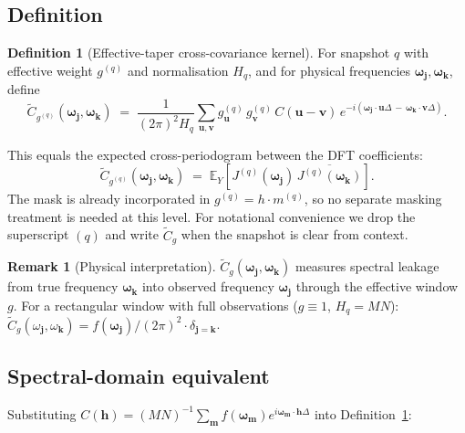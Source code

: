 \documentclass[12pt]{article}
\theoremstyle{definition}
\newtheorem{definition}{Definition}
\newtheorem{remark}{Remark}
\begin{document}
\subsection{Definition}

\begin{definition}[Effective-taper cross-covariance kernel]
\label{def:Ctilde}
For snapshot $q$ with effective weight $g^{(q)}$ and normalisation $H_q$,
and for physical frequencies $\boldsymbol{\omega}_{\mathbf{j}},\boldsymbol{\omega}_{\mathbf{k}}$, define
\[
\boxed{
  \tilde{C}_{g^{(q)}}(\boldsymbol{\omega}_{\mathbf{j}},\boldsymbol{\omega}_{\mathbf{k}})
  \;=\; \frac{1}{(2\pi)^2 H_q}
    \sum_{\mathbf{u},\mathbf{v}}
    g^{(q)}_{\mathbf{u}}\,g^{(q)}_{\mathbf{v}}\,C(\mathbf{u}-\mathbf{v})\,
    e^{-i(\boldsymbol{\omega}_{\mathbf{j}}\cdot\mathbf{u}\Delta\,-\,\boldsymbol{\omega}_{\mathbf{k}}\cdot\mathbf{v}\Delta)}.
}
\]
\end{definition}

This equals the expected cross-periodogram between the DFT coefficients:
\[
  \tilde{C}_{g^{(q)}}(\boldsymbol{\omega}_{\mathbf{j}},\boldsymbol{\omega}_{\mathbf{k}})
  \;=\; \mathbb{E}_Y\!\left[J^{(q)}(\boldsymbol{\omega}_{\mathbf{j}})\,
                             \overline{J^{(q)}(\boldsymbol{\omega}_{\mathbf{k}})}\right].
\]
The mask is already incorporated in $g^{(q)} = h\cdot m^{(q)}$,
so no separate masking treatment is needed at this level.
For notational convenience we drop the superscript $(q)$ and write
$\tilde{C}_g$ when the snapshot is clear from context.

\begin{remark}[Physical interpretation]
$\tilde{C}_g(\boldsymbol{\omega}_{\mathbf{j}},\boldsymbol{\omega}_{\mathbf{k}})$ measures spectral leakage
from true frequency $\boldsymbol{\omega}_{\mathbf{k}}$ into observed frequency
$\boldsymbol{\omega}_{\mathbf{j}}$ through the effective window $g$.
For a rectangular window with full observations ($g\equiv 1$,
$H_q = MN$): $\tilde{C}_g(\omega_{\mathbf{j}},\omega_{\mathbf{k}})
= f(\boldsymbol{\omega}_{\mathbf{j}})/(2\pi)^2\cdot\delta_{\mathbf{j}=\mathbf{k}}$.
\end{remark}

\subsection{Spectral-domain equivalent}
\label{sec:Ctilde_spectral}

Substituting $C(\mathbf{h}) = (MN)^{-1}\sum_{\mathbf{m}} f(\boldsymbol{\omega}_{\mathbf{m}})
e^{i\boldsymbol{\omega}_{\mathbf{m}}\cdot\mathbf{h}\Delta}$ into Definition~\ref{def:Ctilde}:
\end{document}
